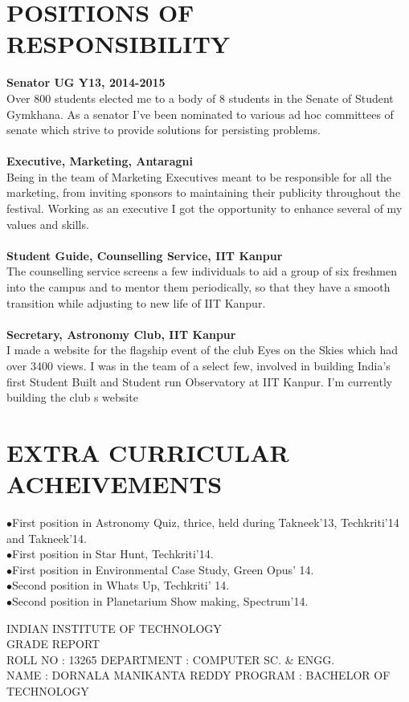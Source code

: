 \documentclass{article}
\newcommand{\NewPart}[1]{\section*{\uppercase{#1}}}
\newcommand{\PORentry}[2]{\textbf{#1} \\ #2	\\
		}
\begin{document}
\NewPart{Positions of Responsibility}
\PORentry{Senator UG Y13, 2014-2015}{Over 800 students elected me to a body of 8 students in the Senate of Student Gymkhana. As a senator I’ve
been nominated to various ad hoc committees of senate which strive to provide solutions for persisting
problems.}
\\
\PORentry{Executive, Marketing, Antaragni}{Being in the team of Marketing Executives meant to be responsible for all the marketing, from inviting
sponsors to maintaining their publicity throughout the festival. Working as an executive I got the opportunity
to enhance several of my values and skills.}
\\
\PORentry{Student Guide, Counselling Service, IIT Kanpur}{The counselling service screens a few individuals to aid a group of six freshmen into the campus and to mentor them periodically, so that they have a smooth transition while adjusting to new life of IIT Kanpur.}
\\
\PORentry{Secretary, Astronomy Club, IIT Kanpur}{I made a website for the flagship event of the club Eyes on the Skies which had over 3400 views.
I was in the team of a select few, involved in building India’s first Student Built and Student run Observatory
at IIT Kanpur. I’m currently building the club s website}
\NewPart{Extra Curricular Acheivements}
$\bullet$First position in Astronomy Quiz, thrice, held during Takneek’13, Techkriti’14 and Takneek’14.\\
$\bullet$First position in Star Hunt, Techkriti’14.\\
$\bullet$First position in Environmental Case Study, Green Opus’ 14.\\
$\bullet$Second position in Whats Up, Techkriti’ 14.\\
$\bullet$Second position in Planetarium Show making, Spectrum’14.\\
\pagebreak
\begin{center}
	\tiny{INDIAN INSTITUTE OF TECHNOLOGY}\\
	\tiny{GRADE REPORT}\\
	\tiny{ROLL NO : 13265} \hfill \tiny{DEPARTMENT : COMPUTER SC. \& ENGG.}\\
	\tiny{NAME : DORNALA MANIKANTA REDDY} \hfill \tiny{PROGRAM : BACHELOR OF TECHNOLOGY}\\
\end{center}
\end{document}
